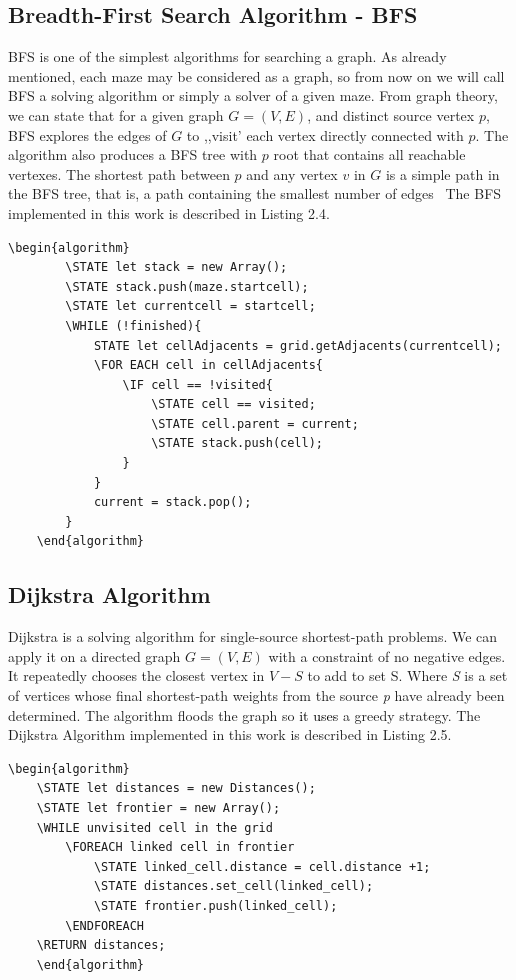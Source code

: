 \subsection{Breadth-First Search Algorithm - BFS}
BFS is one of the simplest algorithms for searching a graph. As already mentioned, each maze may be considered as a graph, so from now on we will call 
BFS  a solving algorithm or simply a solver of a given maze. From graph theory, we can state that for a given graph $ G = ( V, E) $, and distinct source 
vertex $p$, BFS explores the edges of $G$ to ,,visit’ each vertex directly connected with $p$. The algorithm also produces a BFS tree with $p$ root that 
contains all reachable vertexes. The shortest path between $p$ and any vertex $v$ in $G$ is a simple path in the BFS tree, that is, a path containing
the smallest number of edges~\cite{16} The BFS implemented in this work is described in Listing 2.4.\newline
\begin{lstlisting}[caption={Pseudocode for a BFS algorithm}]
	\begin{algorithm}
		\STATE let stack = new Array();
		\STATE stack.push(maze.startcell);
		\STATE let currentcell = startcell;
		\WHILE (!finished){
			STATE let cellAdjacents = grid.getAdjacents(currentcell);
			\FOR EACH cell in cellAdjacents{
				\IF cell == !visited{
					\STATE cell == visited;
					\STATE cell.parent = current;
					\STATE stack.push(cell);
				}
			}
			current = stack.pop();
		}
	\end{algorithm}	
\end{lstlisting}	

\subsection{Dijkstra Algorithm}
Dijkstra is a solving algorithm for single-source shortest-path problems. We can apply it on a directed graph $G=(V, E)$ with a constraint of no negative edges. 
It repeatedly chooses the closest vertex in $V-S$ to add to set S. 
Where \textit{S} is a set of vertices whose final shortest-path weights from the source \textit{p} have already been determined.
The algorithm floods the graph so \textcolor{black}{it uses} a greedy strategy. The Dijkstra Algorithm implemented in this work is described in Listing 2.5.
\newline
\\
\begin{lstlisting}[caption={Pseudocode for a Dijkstra’s algorithm}]
	\begin{algorithm}
	\STATE let distances = new Distances();
	\STATE let frontier = new Array();
	\WHILE unvisited cell in the grid
		\FOREACH linked cell in frontier
			\STATE linked_cell.distance = cell.distance +1;
			\STATE distances.set_cell(linked_cell);
			\STATE frontier.push(linked_cell);
	    \ENDFOREACH
	\RETURN distances;
	\end{algorithm}
	\end{lstlisting}

